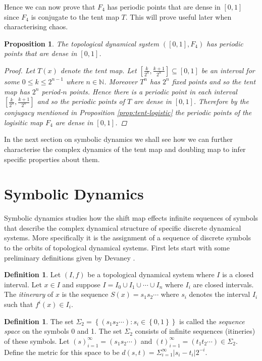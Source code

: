 \documentclass[11pt,a4paper,oneside]{memoir}
\theoremstyle{plain}
\newtheorem{prop}[thm]{Proposition}
\theoremstyle{definition}
\newtheorem{defn}[thm]{Definition}
\begin{document}
Hence we can now prove that $F_4$ has periodic points that are dense in $[0, 1]$ since $F_4$ is conjugate to the tent map $T$. This will prove useful later when characterising chaos.

\begin{prop} \label{prop:logisitc-periodic-dense}
    The topological dynamical system $([0, 1], F_4)$ has periodic points that are dense in $[0, 1]$.
    \begin{proof}
    Let $T(x)$ denote the tent map. Let $\left[\frac{k}{2^n}, \frac{k+1}{2^n}\right] \subseteq [0, 1]$ be an interval for some $0 \leq k \leq 2^{n-1}$ where $n \in \mathbb{N}$. Moreover $T^n$ has $2^n$ fixed points and so the tent map has $2^n$ period-$n$ points. Hence there is a periodic point in each interval $\left[\frac{k}{2^n}, \frac{k+1}{2^n}\right]$ and so the periodic points of $T$ are dense in $[0, 1]$. Therefore by the conjugacy mentioned in Proposition \ref{prop:tent-logistic} the periodic points of the logisitic map $F_4$ are dense in $[0, 1]$.
    \end{proof}
\end{prop}

In the next section on symbolic dynamics we shall see how we can further characterise the complex dynamics of the tent map and doubling map to infer specific properties about them.

\section{Symbolic Dynamics}
Symbolic dynamics studies how the shift map effects infinite sequences of symbols that describe the complex dynamical structure of specific discrete dynamical systems. More specifically it is the assignment of a sequence of discrete symbols to the orbits of topological dynamical systems. First lets start with some preliminary definitions given by Devaney \cite[Section 1.6]{devaney}.

\begin{defn}
    Let $(I, f)$ be a topological dynamical system where $I$ is a closed interval. Let $x \in I$ and suppose $I = I_0 \cup I_1 \cup \cdots \cup I_n$ where $I_i$ are closed intervals. The \emph{itinerary} of $x$ is the sequence $S(x) = s_1s_2\cdots$ where $s_i$ denotes the interval $I_i$ such that $f^i(x) \in I_i$.
\end{defn}

\begin{defn}
    The set $\Sigma_2 = \left\lbrace (s_1s_2\cdots): s_i \in \left\lbrace 0, 1 \right\rbrace \right\rbrace$ is called the \emph{sequence space} on the symbols 0 and 1. The set $\Sigma_2$ consists of infinite sequences (itineries) of these symbols. Let $(s)_{i=1}^{\infty} = (s_1s_2\cdots)$ and $(t)_{i=1}^{\infty} = (t_1t_2\cdots) \in \Sigma_2$. Define the metric for this space to be $d(s, t) = \Sigma_{i=1}^{\infty}|s_i - t_i|2^{-i}$.
\end{defn}
\end{document}
